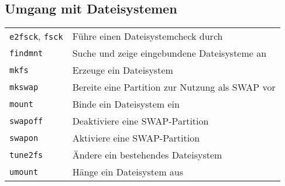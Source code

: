 \documentclass[10pt,a4paper]{article}
\begin{document}
\begin{multicols}{2} 
\section{Umgang mit Dateisystemen}
\begin{tabular}{ p{2.5cm} p{8.5cm} }
  \hline
  \texttt{e2fsck}, \texttt{fsck} & Führe einen Dateisystemcheck durch \\
  \rowcolor{Gray}
  \texttt{findmnt} & Suche und zeige eingebundene Dateisysteme an \\
  \texttt{mkfs} & Erzeuge ein Dateisystem \\
  \rowcolor{Gray}
  \texttt{mkswap} & Bereite eine Partition zur Nutzung als SWAP vor \\
  \texttt{mount} & Binde ein Dateisystem ein \\
  \rowcolor{Gray}
  \texttt{swapoff} & Deaktiviere eine SWAP-Partition \\
  \texttt{swapon} & Aktiviere eine SWAP-Partition \\
  \rowcolor{Gray}
  \texttt{tune2fs} & Ändere ein bestehendes Dateisystem \\
  \texttt{umount} & Hänge ein Dateisystem aus \\
  \hline
\end{tabular}



\end{multicols}
\end{document}
